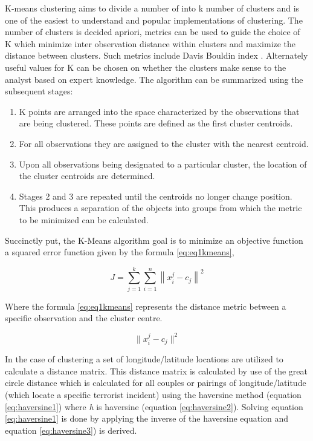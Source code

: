 K-means clustering aims to divide a number of into k number of clusters and is one of the easiest to understand and popular implementations of clustering. The number of clusters is decided apriori, metrics can be used to guide the choice of K which minimize inter observation distance within clusters and maximize the distance between clusters. Such metrics include Davis Bouldin index \citep{davies1979cluster}. Alternately useful values for K can be chosen on whether the clusters make sense to the analyst based on expert knowledge. The algorithm can be summarized using the subsequent stages:
\begin{enumerate}
\item K points are arranged into the space characterized by the observations that are being clustered. These points are defined as the first cluster centroids.
\item For all observations they are assigned to the cluster with the nearest centroid.
\item Upon all observations being designated to a particular cluster, the location of the cluster centroids are determined.
\item Stages 2 and 3 are repeated until the centroids no longer change position. This produces a separation of the objects into groups from which the metric to be minimized can be calculated.
\end{enumerate}
Succinctly put, the K-Means algorithm goal is to minimize an objective function a squared error function given by the formula \ref{eq:eq1kmeans}, 

\begin{equation} J=\sum_{j=1}^{k}\sum_{i=1}^{n}\left \| x_{i}^{j} - c_{j} \right \|^{2} \label{eq:eq1kmeans}  \end{equation}

Where the formula \ref{eq:eq1kmeans} represents the distance metric between a specific observation and the cluster centre. 

\begin{equation} \| x_{i}^{j} - c_{j} \|^{2}  \label{eq:eq2kmeans}  \end{equation}

In the case of clustering  a set of longitude/latitude locations are utilized to calculate a distance matrix. This distance matrix is calculated by use of the great circle distance which is calculated for all couples or pairings of longitude/latitude (which locate a specific terrorist incident) using the haversine method (equation \ref{eq:haversine1}) where \textit{h} is haversine (equation \ref{eq:haversine2}). Solving equation \ref{eq:haversine1} is done by applying the inverse of the haversine equation and equation \ref{eq:haversine3}) is derived.  

